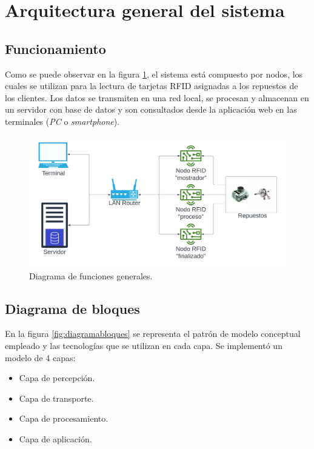 \section{Arquitectura general del sistema}
\label{sec:arquitecturagral}

\subsection{Funcionamiento}
\label{subsec:funcionamiento}
Como se puede observar en la figura \ref{fig:diagramafunciones}, el sistema está compuesto por nodos, los cuales se utilizan para la lectura de tarjetas RFID asignadas a los repuestos de los clientes. Los datos se transmiten en una red local, se procesan y almacenan en un servidor con base de datos y son consultados desde la aplicación web en las terminales (\textit{PC} o \textit{smartphone}).

\begin{figure}[H]
	\centering
	\includegraphics[width=\textwidth]{./Figures/diagramafunciones.png}
	\caption{Diagrama de funciones generales.}
	\label{fig:diagramafunciones}
\end{figure}

\subsection{Diagrama de bloques}
\label{subsec:diagramabloques}
En la figura \ref{fig:diagramabloques} se representa el patrón de modelo conceptual empleado y las tecnologías que se utilizan en cada capa. Se implementó un modelo de 4 capas: 

\begin{itemize}
\item Capa de percepción.
\item Capa de transporte.
\item Capa de procesamiento.
\item Capa de aplicación.
\end{itemize}


